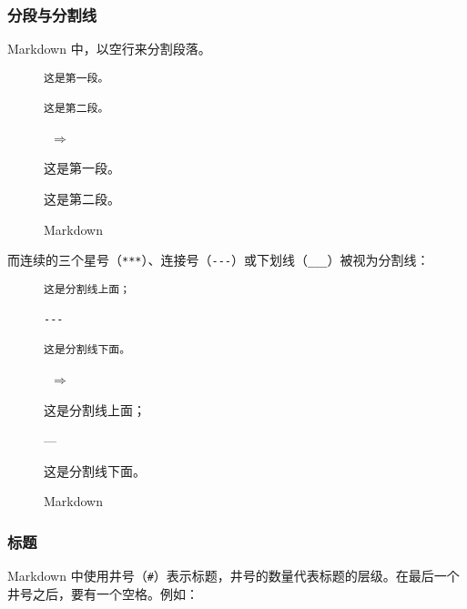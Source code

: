 \documentclass[a4paper,fontset=none]{ctexart}
\begin{document}
\subsubsection{分段与分割线}

Markdown 中，以空行来分割段落。

\begin{figure}[H]
    \centering
    \begin{minipage}{0.45\textwidth}
        \begin{verbatim}
这是第一段。

这是第二段。
        \end{verbatim}
    \end{minipage}
    \, $\Longrightarrow$ \,
    \begin{minipage}{0.45\textwidth}
\begin{markdown}
这是第一段。

这是第二段。
\end{markdown}
    \end{minipage}
    \caption{Markdown}
\end{figure}

而连续的三个星号（\verb|***|）、连接号（\verb|---|）或下划线（\verb|___|）被视为分割线：

\begin{figure}[H]
    \centering
    \begin{minipage}{0.45\textwidth}
        \begin{verbatim}
这是分割线上面；

---

这是分割线下面。
        \end{verbatim}
    \end{minipage}
    \, $\Longrightarrow$ \,
    \begin{minipage}{0.45\textwidth}
\begin{markdown}
这是分割线上面；

---

这是分割线下面。
\end{markdown}
    \end{minipage}
    \caption{Markdown}
\end{figure}

\subsubsection{标题}

Markdown 中使用井号（\verb|#|）表示标题，井号的数量代表标题的层级。在最后一个井号之后，要有一个空格。例如：
\end{document}
